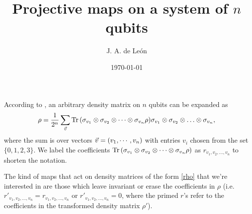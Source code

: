 \documentclass[11pt]{article}
\begin{document}
\title{Projective maps on a system of $n$ qubits} 
\author{J. A. de Le\'on} 


\date{\today}  

\maketitle


According to \cite{nielsen_chuang_2011}, an arbitrary density matrix on $n$  
qubits can be expanded as
\begin{align}
	\rho = \frac{1}{2^n}\sum _{\vec{v}} \Tr 
                  \qty( \sigma _{v_1} \otimes \sigma_{v_2} \otimes 
               \cdots \otimes \sigma_{v_n} \rho) \sigma _{v_1} \otimes 
             \sigma_{v_2} \otimes \ldots \otimes \sigma_{v_n},
	\label{rho}
\end{align}
where the sum is over vectors $\vec{v}=\qty(v_1,\cdots, v_n)$ with entries
$v_i$ chosen from the set $\{0,1,2,3\}$. We label the coefficients $\Tr \qty(
\sigma _{v_1} \otimes \sigma_{v_2} \otimes \cdots \otimes \sigma_{v_n}
\rho )$ as $r_{v_1, v_2,\ldots, v_n}$ to shorten the notation. 

The kind of maps that act on density matrices of the form \eqref{rho} that
we're interested in are those which leave invariant or erase the 
coefficients
in $\rho$ (i.e. $r'_{v_1, v_2,\ldots, v_n}=r_{v_1, v_2,\ldots, v_n}$ or
$r'_{v_1, v_2,\ldots, v_n}=0$, where the primed $r$'s refer to the 
coefficients in the transformed density matrix $\rho '$). 
\end{document}
